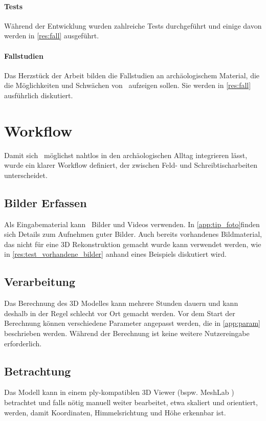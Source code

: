 		\paragraph{Tests}
		Während der Entwicklung wurden zahlreiche Tests durchgeführt und einige davon werden in \autoref{res:fall} ausgeführt.
		
		\paragraph{Fallstudien}
		Das Herzstück der Arbeit bilden die Fallstudien an archäologischem Material, die die Möglichkeiten und Schwächen von \dronarch\ aufzeigen sollen. Sie werden in \autoref{res:fall} ausführlich diskutiert.
		
	\section{Workflow}
		Damit sich \dronarch\ möglichst nahtlos in den archäologischen Alltag integrieren lässt, wurde ein klarer Workflow definiert, der zwischen Feld- und Schreibtischarbeiten unterscheidet.
		
		\subsection{Bilder Erfassen}
			Als Eingabematerial kann \dronarch\ Bilder und Videos verwenden. In \autoref{app:tip_foto}finden sich Details zum Aufnehmen guter Bilder.
			Auch bereits vorhandenes Bildmaterial, das nicht für eine 3D Rekonstruktion gemacht wurde kann  verwendet werden, wie in \autoref{res:test_vorhandene_bilder} anhand eines Beispiels diskutiert wird.
		
		\subsection{Verarbeitung}
			Das Berechnung des 3D Modelles kann mehrere Stunden dauern und kann deshalb in der Regel schlecht vor Ort gemacht werden. Vor dem Start der Berechnung können verschiedene Parameter angepasst werden, die in \autoref{app:param} beschrieben werden.
			Während der Berechnung ist keine weitere Nutzereingabe erforderlich.
		
		\subsection{Betrachtung}
			Das Modell kann in einem ply-kompatiblen 3D Viewer (bspw. MeshLab ) betrachtet und falls nötig manuell weiter bearbeitet, etwa skaliert und orientiert, werden, damit Koordinaten, Himmelsrichtung und Höhe erkennbar ist.

